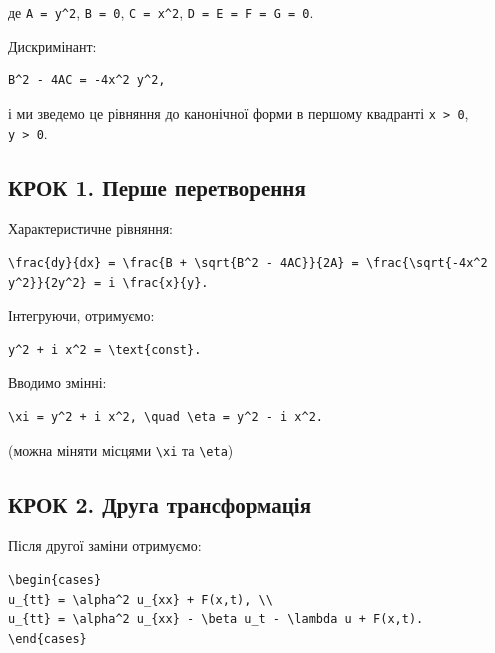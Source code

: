 \documentclass[
  ukrainian,
]{article}
\begin{document}
де \texttt{A\ =\ y\^{}2}, \texttt{B\ =\ 0}, \texttt{C\ =\ x\^{}2},
\texttt{D\ =\ E\ =\ F\ =\ G\ =\ 0}.

Дискримінант:

\begin{verbatim}
B^2 - 4AC = -4x^2 y^2,
\end{verbatim}

і ми зведемо це рівняння до канонічної форми в першому квадранті
\texttt{x\ \textgreater{}\ 0}, \texttt{y\ \textgreater{}\ 0}.

\subsection{КРОК 1. Перше
перетворення}\label{ux43aux440ux43eux43a-1.-ux43fux435ux440ux448ux435-ux43fux435ux440ux435ux442ux432ux43eux440ux435ux43dux43dux44f}

Характеристичне рівняння:

\begin{verbatim}
\frac{dy}{dx} = \frac{B + \sqrt{B^2 - 4AC}}{2A} = \frac{\sqrt{-4x^2 y^2}}{2y^2} = i \frac{x}{y}.
\end{verbatim}

Інтегруючи, отримуємо:

\begin{verbatim}
y^2 + i x^2 = \text{const}.
\end{verbatim}

Вводимо змінні:

\begin{verbatim}
\xi = y^2 + i x^2, \quad \eta = y^2 - i x^2.
\end{verbatim}

(можна міняти місцями \texttt{\textbackslash{}xi} та
\texttt{\textbackslash{}eta})

\subsection{КРОК 2. Друга
трансформація}\label{ux43aux440ux43eux43a-2.-ux434ux440ux443ux433ux430-ux442ux440ux430ux43dux441ux444ux43eux440ux43cux430ux446ux456ux44f}

Після другої заміни отримуємо:

\begin{verbatim}
\begin{cases}
u_{tt} = \alpha^2 u_{xx} + F(x,t), \\
u_{tt} = \alpha^2 u_{xx} - \beta u_t - \lambda u + F(x,t).
\end{cases}
\end{verbatim}
\end{document}
